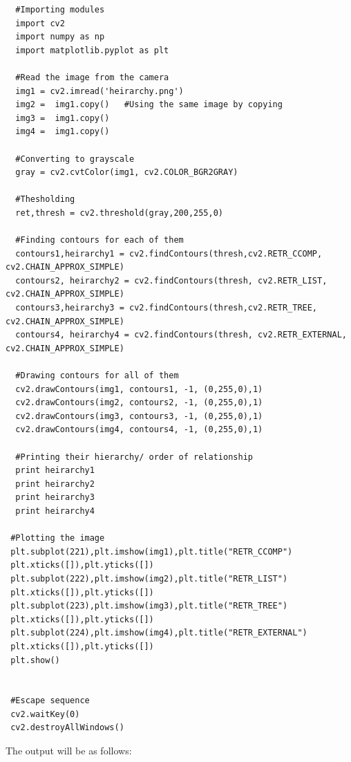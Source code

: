 \documentclass[]{article}
\begin{document}
\begin{verbatim}
  #Importing modules
  import cv2
  import numpy as np
  import matplotlib.pyplot as plt

  #Read the image from the camera
  img1 = cv2.imread('heirarchy.png')
  img2 =  img1.copy()   #Using the same image by copying
  img3 =  img1.copy()
  img4 =  img1.copy()

  #Converting to grayscale
  gray = cv2.cvtColor(img1, cv2.COLOR_BGR2GRAY)

  #Thesholding
  ret,thresh = cv2.threshold(gray,200,255,0)

  #Finding contours for each of them
  contours1,heirarchy1 = cv2.findContours(thresh,cv2.RETR_CCOMP, cv2.CHAIN_APPROX_SIMPLE)
  contours2, heirarchy2 = cv2.findContours(thresh, cv2.RETR_LIST, cv2.CHAIN_APPROX_SIMPLE)
  contours3,heirarchy3 = cv2.findContours(thresh,cv2.RETR_TREE, cv2.CHAIN_APPROX_SIMPLE)
  contours4, heirarchy4 = cv2.findContours(thresh, cv2.RETR_EXTERNAL, cv2.CHAIN_APPROX_SIMPLE)

  #Drawing contours for all of them
  cv2.drawContours(img1, contours1, -1, (0,255,0),1)
  cv2.drawContours(img2, contours2, -1, (0,255,0),1)
  cv2.drawContours(img3, contours3, -1, (0,255,0),1)
  cv2.drawContours(img4, contours4, -1, (0,255,0),1)

  #Printing their hierarchy/ order of relationship
  print heirarchy1
  print heirarchy2
  print heirarchy3
  print heirarchy4

 #Plotting the image 
 plt.subplot(221),plt.imshow(img1),plt.title("RETR_CCOMP")
 plt.xticks([]),plt.yticks([])
 plt.subplot(222),plt.imshow(img2),plt.title("RETR_LIST")
 plt.xticks([]),plt.yticks([])
 plt.subplot(223),plt.imshow(img3),plt.title("RETR_TREE")
 plt.xticks([]),plt.yticks([])
 plt.subplot(224),plt.imshow(img4),plt.title("RETR_EXTERNAL")
 plt.xticks([]),plt.yticks([])
 plt.show()


 #Escape sequence
 cv2.waitKey(0)
 cv2.destroyAllWindows()
\end{verbatim}

The output will be as follows:
\end{document}
